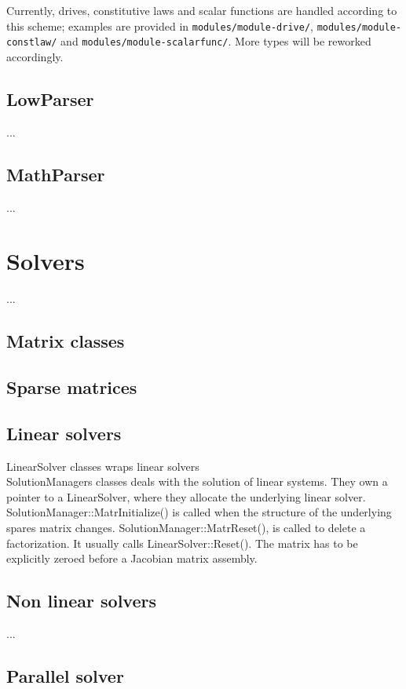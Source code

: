\documentclass[10pt,fleqn,subeqn]{report}
\begin{document}
Currently, drives, constitutive laws and scalar functions are handled
according to this scheme; examples are provided
in \texttt{modules/module-drive/},
\texttt{modules/module-constlaw/}
and
\texttt{modules/module-scalarfunc/}.
More types will be reworked accordingly.



\section{LowParser}
... 

\section{MathParser}
...

\chapter{Solvers}
...
\section{Matrix classes}

\section{Sparse matrices}

\section{Linear solvers}
LinearSolver classes wraps linear solvers\\
SolutionManagers classes deals with the solution of linear systems.
They own a pointer to a LinearSolver, where they allocate
the underlying linear solver.
SolutionManager::MatrInitialize() is called
when the structure of the underlying spares matrix changes.
SolutionManager::MatrReset(), is called to delete a factorization.
It usually calls LinearSolver::Reset(). The matrix has to be explicitly
zeroed before a Jacobian matrix assembly.

\section{Non linear solvers}
...
\section{Parallel solver}
\end{document}
